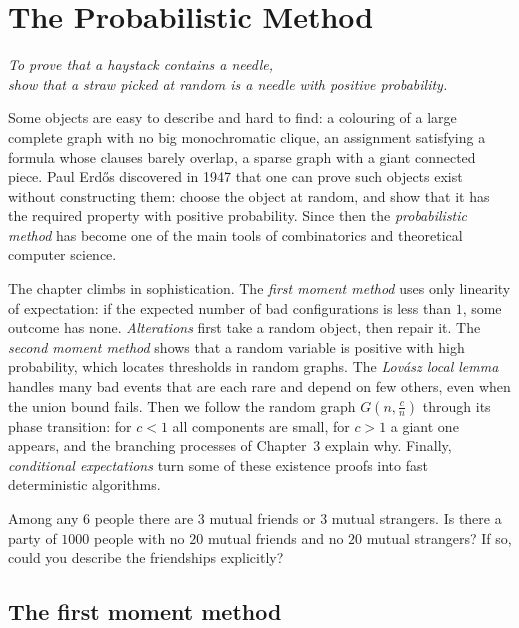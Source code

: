 \chapter{The Probabilistic Method}

\begin{center}\itshape
To prove that a haystack contains a needle,\\
show that a straw picked at random is a needle with positive probability.
\end{center}

Some objects are easy to describe and hard to find: a colouring of a large complete graph with no big monochromatic
clique, an assignment satisfying a formula whose clauses barely overlap, a sparse graph with a giant connected
piece. Paul Erd\H os discovered in 1947 that one can prove such objects exist without constructing them: choose the
object at random, and show that it has the required property with positive probability. Since then the
\emph{probabilistic method} has become one of the main tools of combinatorics and theoretical computer science.

The chapter climbs in sophistication. The \emph{first moment method} uses only linearity of expectation: if the expected
number of bad configurations is less than $1$, some outcome has none. \emph{Alterations} first take a random object, then
repair it. The \emph{second moment method} shows that a random variable is positive with high probability, which
locates thresholds in random graphs. The \emph{Lov\'asz local lemma} handles many bad events that are each rare and
depend on few others, even when the union bound fails. Then we follow the random graph $G(n,\frac cn)$ through its phase
transition: for $c<1$ all components are small, for $c>1$ a giant one appears, and the branching processes of Chapter~3
explain why. Finally, \emph{conditional expectations} turn some of these existence proofs into fast deterministic
algorithms.

\begin{think}
Among any $6$ people there are $3$ mutual friends or $3$ mutual strangers. Is there a party of $1000$ people with no $20$
mutual friends and no $20$ mutual strangers? If so, could you describe the friendships explicitly?
\end{think}

\section{The first moment method}

